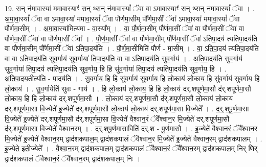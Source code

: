 \documentclass[17pt]{extarticle}
\begin{document}
19. सन् न॑मावा॒स्या॑ ममावा॒स्याꣳ॑ सन् थ्सन् न॑मावा॒स्यां᳚ ॅवा वा ऽमावा॒स्याꣳ॑ सन् थ्सन् न॑मावा॒स्यां᳚ ॅवा । . अ॒मा॒वा॒स्यां᳚ ॅवा वा ऽमावा॒स्या॑ ममावा॒स्यां᳚ ॅवा पौर्णमा॒सीम् पौ᳚र्णमा॒सीं ॅवा॑ ऽमावा॒स्या॑ ममावा॒स्यां᳚ ॅवा पौर्णमा॒सीम् । . अ॒मा॒वा॒स्या॑मित्य॑मा - वा॒स्या᳚म् । . वा॒ पौ॒र्ण॒मा॒सीम् पौ᳚र्णमा॒सीं ॅवा॑ वा पौर्णमा॒सीं ॅवा॑ वा पौर्णमा॒सीं ॅवा॑ वा पौर्णमा॒सीं ॅवा᳚ । . पौ॒र्ण॒मा॒सीं ॅवा॑ वा पौर्णमा॒सीम् पौ᳚र्णमा॒सीं ॅवा॑ ऽतिपा॒दय॑ त्यतिपा॒दय॑ति वा पौर्णमा॒सीम् पौ᳚र्णमा॒सीं ॅवा॑ ऽतिपा॒दय॑ति । . पौ॒र्ण॒मा॒सीमिति॑ पौर्ण - मा॒सीम् । . वा॒ ऽति॒पा॒दय॑ त्यतिपा॒दय॑ति वा वा ऽतिपा॒दय॑ति सुव॒र्गाय॑ सुव॒र्गाया॑ तिपा॒दय॑ति वा वा ऽतिपा॒दय॑ति सुव॒र्गाय॑ । . अ॒ति॒पा॒दय॑ति सुव॒र्गाय॑ सुव॒र्गाया॑ तिपा॒दय॑ त्यतिपा॒दय॑ति सुव॒र्गाय॒ हि हि सु॑व॒र्गाया॑ तिपा॒दय॑ त्यतिपा॒दय॑ति सुव॒र्गाय॒ हि । . अ॒ति॒पा॒दय॒तीत्य॑ति - पा॒दय॑ति । . सु॒व॒र्गाय॒ हि हि सु॑व॒र्गाय॑ सुव॒र्गाय॒ हि लो॒काय॑ लो॒काय॒ हि सु॑व॒र्गाय॑ सुव॒र्गाय॒ हि लो॒काय॑ । . सु॒व॒र्गायेति॑ सुवः - गाय॑ । . हि लो॒काय॑ लो॒काय॒ हि हि लो॒काय॑ दर्.शपूर्णमा॒सौ द॑र्.शपूर्णमा॒सौ लो॒काय॒ हि हि लो॒काय॑ दर्.शपूर्णमा॒सौ । . लो॒काय॑ दर्.शपूर्णमा॒सौ द॑र्.शपूर्णमा॒सौ लो॒काय॑ लो॒काय॑ दर्.शपूर्णमा॒सा वि॒ज्येते॑ इ॒ज्येते॑ दर्.शपूर्णमा॒सौ लो॒काय॑ लो॒काय॑ दर्.शपूर्णमा॒सा वि॒ज्येते᳚ । . द॒र्॒.श॒पू॒र्ण॒मा॒सा वि॒ज्येते॑ इ॒ज्येते॑ दर्.शपूर्णमा॒सौ द॑र्.शपूर्णमा॒सा वि॒ज्येते॑ वैश्वान॒रं ॅवै᳚श्वान॒र मि॒ज्येते॑ दर्.शपूर्णमा॒सौ द॑र्.शपूर्णमा॒सा वि॒ज्येते॑ वैश्वान॒रम् । . द॒र्॒.श॒पू॒र्ण॒मा॒साविति॑ दर्.श - पू॒र्ण॒मा॒सौ । . इ॒ज्येते॑ वैश्वान॒रं ॅवै᳚श्वान॒र मि॒ज्येते॑ इ॒ज्येते॑ वैश्वान॒रम् द्वाद॑शकपाल॒म् द्वाद॑शकपालं ॅवैश्वान॒र मि॒ज्येते॑ इ॒ज्येते॑ वैश्वान॒रम् द्वाद॑शकपालम् । . इ॒ज्येते॒ इती॒ज्येते᳚ । . वै॒श्वा॒न॒रम् द्वाद॑शकपाल॒म् द्वाद॑शकपालं ॅवैश्वान॒रं ॅवै᳚श्वान॒रम् द्वाद॑शकपाल॒म् निर् णिर् द्वाद॑शकपालं ॅवैश्वान॒रं ॅवै᳚श्वान॒रम् द्वाद॑शकपाल॒म् निः । \newline
\end{document}
